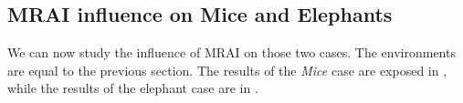 
\subsection{MRAI influence on Mice and Elephants}
\label{subsec:bgp_rfd_mrai_influence_mice_elephants}

We can now study the influence of \ac{MRAI} on those two cases.
The environments are equal to the previous section.
The results of the \textit{Mice} case are exposed in ,
while the results of the elephant case are in .

